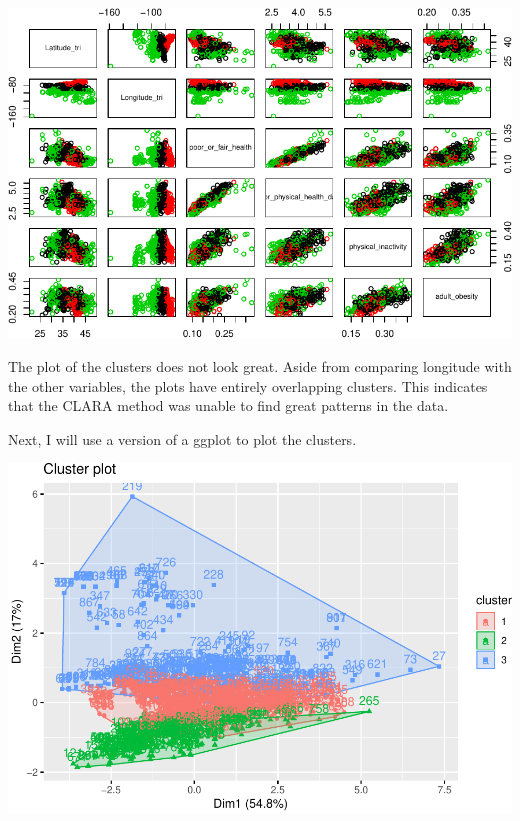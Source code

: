 \documentclass[12pt,twoside]{amherstthesis}
\begin{document}
  \begin{center}\includegraphics{Comps_Proj_files/figure-latex/unnamed-chunk-9-1} \end{center}
  
  The plot of the clusters does not look great. Aside from comparing
  longitude with the other variables, the plots have entirely overlapping
  clusters. This indicates that the CLARA method was unable to find great
  patterns in the data.
  
  Next, I will use a version of a ggplot to plot the clusters.
  
  \begin{Shaded}
  \begin{Highlighting}[]
  \OperatorTok{::}
  \end{Highlighting}
  \end{Shaded}
  
  \begin{center}\includegraphics{Comps_Proj_files/figure-latex/unnamed-chunk-10-1} \end{center}
  
\end{document}
